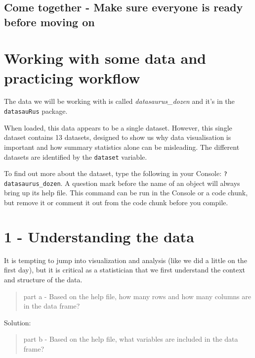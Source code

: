 \documentclass[
  letterpaper,
  DIV=11,
  numbers=noendperiod]{scrartcl}
\begin{document}
\hypertarget{come-together---make-sure-everyone-is-ready-before-moving-on}{%
\subsection{Come together - Make sure everyone is ready before moving
on}\label{come-together---make-sure-everyone-is-ready-before-moving-on}}

\newpage

\hypertarget{working-with-some-data-and-practicing-workflow}{%
\section{Working with some data and practicing
workflow}\label{working-with-some-data-and-practicing-workflow}}

The data we will be working with is called \emph{datasaurus\_dozen} and
it's in the \texttt{datasauRus} package.

When loaded, this data appears to be a single dataset. However, this
single dataset contains 13 datasets, designed to show us why data
visualisation is important and how summary statistics alone can be
misleading. The different datasets are identified by the
\texttt{dataset} variable.

To find out more about the dataset, type the following in your Console:
\texttt{?datasaurus\_dozen}. A question mark before the name of an
object will always bring up its help file. This command can be run in
the Console or a code chunk, but remove it or comment it out from the
code chunk before you compile.

\hypertarget{understanding-the-data}{%
\section{1 - Understanding the data}\label{understanding-the-data}}

It is tempting to jump into visualization and analysis (like we did a
little on the first day), but it is critical as a statistician that we
first understand the context and structure of the data.

\begin{quote}
part a - Based on the help file, how many rows and how many columns are
in the data frame?
\end{quote}

Solution:

\begin{quote}
part b - Based on the help file, what variables are included in the data
frame?
\end{quote}
\end{document}
